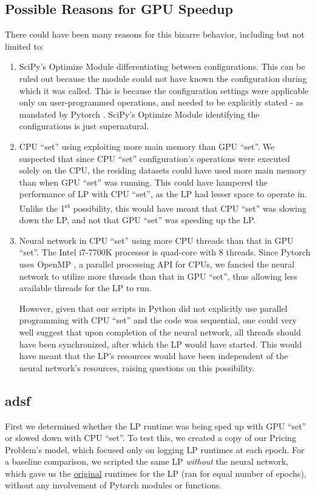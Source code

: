 \begin{appendices}
    \subsection{Possible Reasons for GPU Speedup} \label{sec:Possible Reasons for GPU Speedup}
    There could have been many reasons for this bizarre behavior, including but not limited to:
    \begin{enumerate}
        \item SciPy's Optimize Module differentiating between configurations. This can be ruled out because the module could not have known the configuration during which it was called. This is because the configuration settings were applicable only on user-programmed operations, and needed to be explicitly stated - as mandated by Pytorch \cite{PTDocs}. SciPy's Optimize Module identifying the configurations is just supernatural.
        \item CPU ``set'' using exploiting more main memory than GPU ``set''. We suspected that since CPU ``set'' configuration's operations were executed solely on the CPU, the residing datasets could have used more main memory than when GPU ``set'' was running. This could have hampered the performance of LP with CPU ``set'', as the LP had lesser space to operate in. Unlike the 1\textsuperscript{st} possibility, this would have meant that CPU ``set'' was slowing down the LP, and not that GPU ``set'' was speeding up the LP.
        \item Neural network in CPU ``set'' using more CPU threads than that in GPU ``set''. The Intel i7-7700K processor is quad-core with 8 threads. Since Pytorch uses OpenMP \cite{PTDocs}, a parallel processing API for CPUs, we fancied the neural network to utilize more threads than that in GPU ``set'', thus allowing less available threads for the LP to run. 
        
        However, given that our scripts in Python did not explicitly use parallel programming with CPU ``set'' and the code was sequential, one could very well suggest that upon completion of the neural network, all threads should have been synchronized, after which the LP would have started. This would have meant that the LP's resources would have been independent of the neural network's resources, raising questions on this possibility.
    \end{enumerate}

    \subsection{adsf}
    First we determined whether the LP runtime was being sped up with GPU ``set'' or slowed down with CPU ``set''. To test this, we created a copy of our Pricing Problem's model, which focused only on logging LP runtimes at each epoch. For a baseline comparison, we scripted the same LP \textit{without} the neural network, which gave us the \underline{original} runtimes for the LP (ran for equal number of epochs), without any involvement of Pytorch modules or functions. 
    

\end{appendices}
